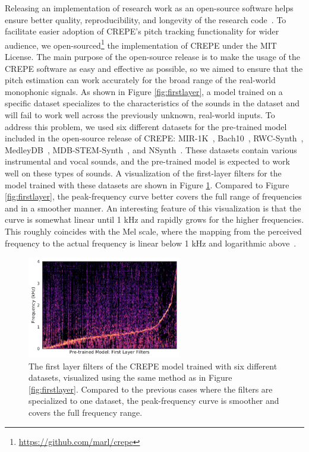 Releasing an implementation of research work as an open-source software helps ensure better quality, reproducibility, and longevity of the research code~\cite{mcfee2019opensource}.
To facilitate easier adoption of CREPE's pitch tracking functionality for wider audience, we open-sourced\footnote{\url{https://github.com/marl/crepe}} the implementation of CREPE under the MIT License.
The main purpose of the open-source release is to make the usage of the CREPE software as easy and effective as possible, so we aimed to ensure that the pitch estimation can work accurately for the broad range of the real-world monophonic signals.
As shown in Figure \ref{fig:firstlayer}, a model trained on a specific dataset specializes to the characteristics of the sounds in the dataset and will fail to work well across the previously unknown, real-world inputs.
To address this problem, we used six different datasets for the pre-trained model included in the open-source release of CREPE: MIR-1K~\cite{hsu2010mir1k}, Bach10~\cite{duan2010bach10}, RWC-Synth~\cite{mauch2014pyin}, MedleyDB~\cite{bittner2014medleydb}, MDB-STEM-Synth~\cite{salamon2017analysis}, and NSynth~\cite{engel2017nsynth}.
These datasets contain various instrumental and vocal sounds, and the pre-trained model is expected to work well on these types of sounds.
A visualization of the first-layer filters for the model trained with these datasets are shown in Figure \ref{fig:firstlayer-one}.
Compared to Figure \ref{fig:firstlayer}, the peak-frequency curve better covers the full range of frequencies and in a smoother manner.
An interesting feature of this visualization is that the curve is somewhat linear until 1 kHz and rapidly grows for the higher frequencies.
This roughly coincides with the Mel scale, where the mapping from the perceived frequency to the actual frequency is linear below 1 kHz and logarithmic above~\cite{logan2000mfcc}.


\begin{figure}
	\centering
	\includegraphics[width=0.6\textwidth]{firstlayer-one.pdf}
	\caption{The first layer filters of the CREPE model trained with six different datasets, visualized using the same method as in Figure \ref{fig:firstlayer}. Compared to the previous cases where the filters are specialized to one dataset, the peak-frequency curve is smoother and covers the full frequency range.}\label{fig:firstlayer-one}
\end{figure}

